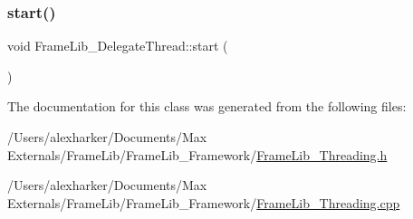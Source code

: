 \subsubsection{\texorpdfstring{start()}{start()}}
{\footnotesize\ttfamily void Frame\+Lib\+\_\+\+Delegate\+Thread\+::start (\begin{DoxyParamCaption}{ }\end{DoxyParamCaption})\hspace{0.3cm}{\ttfamily [inline]}}



The documentation for this class was generated from the following files\+:\begin{DoxyCompactItemize}
\item 
/\+Users/alexharker/\+Documents/\+Max Externals/\+Frame\+Lib/\+Frame\+Lib\+\_\+\+Framework/\hyperlink{_frame_lib___threading_8h}{Frame\+Lib\+\_\+\+Threading.\+h}\item 
/\+Users/alexharker/\+Documents/\+Max Externals/\+Frame\+Lib/\+Frame\+Lib\+\_\+\+Framework/\hyperlink{_frame_lib___threading_8cpp}{Frame\+Lib\+\_\+\+Threading.\+cpp}\end{DoxyCompactItemize}
